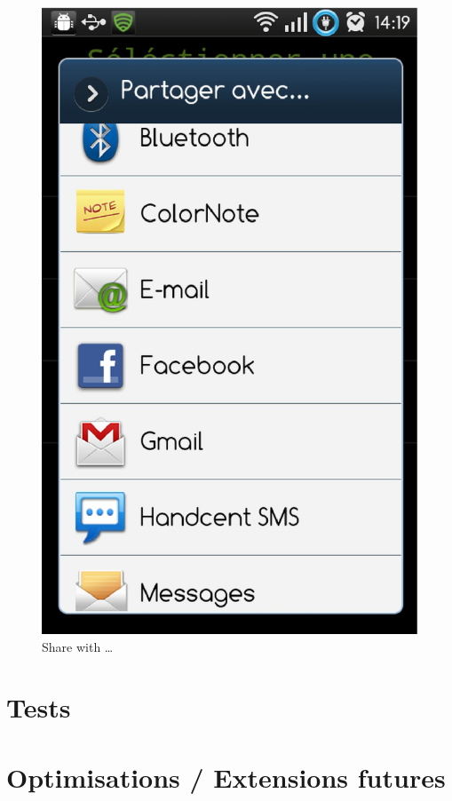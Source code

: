\begin{figure}[H]
\centering
  \label{partage}
   \includegraphics[scale=0.4]{Images/partage.eps}
  \caption{Share with \ldots}
\end{figure}  



\section{Tests}

\section{Optimisations / Extensions futures}
